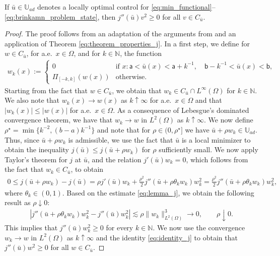 \documentclass[final]{siamart0216}
\begin{document}
\begin{theorem}\label{theorem_neccesary_conditions} If $\bar{u}\in \mathbb{U}_{ad}$ denotes a locally optimal control for \eqref{eq:min_functional}--\eqref{eq:brinkamn_problem_state}, then $j''(\bar{u})v^2\geq 0$ for all $v\in C_{\bar{u}}$.
\end{theorem}
\begin{proof}
The proof follows from an adaptation of the arguments from \cite[Theorem 23]{MR3586845} and an application of Theorem \ref{eq:theorem_properties_j}. In a first step, we define for $w\in C_{\bar{u}}$, for a.e.~$x\in\Omega$, and for $k\in\mathbb{N}$, the function 
\begin{eqnarray*}
w_k(x):=\left\{
\begin{array}{cl}
0 & \text{if } x: \mathsf{a}<\bar{u}(x)<\mathsf{a}+k^{-1},\quad \mathsf{b}-k^{-1}<\bar{u}(x)<\mathsf{b},\\
\Pi_{[-k,k]}(w(x)) & \text{otherwise}.
\end{array}
\right.
\end{eqnarray*}
Starting from the fact that $w\in C_{\bar{u}}$, we obtain that $w_k\in C_{\bar{u}}\cap L^{\infty}(\Omega)$ for $k \in \mathbb{N}$. We also note that $w_k(x)\to w(x)$ as $k\uparrow\infty$ for a.e.~$x\in\Omega$ and that $|w_k(x)|\leq |w(x)|$ for a.e.~$x\in\Omega$. As a consequence of Lebesgue's dominated convergence theorem, we have that $w_k\to w$ in $L^2(\Omega)$ as $k\uparrow\infty$. We now define $\rho^{\star}=\min\{k^{-2},(b-a)k^{-1}\}$ and note that for $\rho \in (0, \rho^{\star}]$ we have $\bar{u}+\rho w_k \in \mathbb{U}_{ad}$. Thus, since $\bar{u}+\rho w_k$ is admissible, we use the fact that $\bar{u}$ is a local minimizer to obtain the inequality $j(\bar{u})\leq j(\bar{u}+\rho w_k)$ for $\rho$ sufficiently small. We now apply Taylor's theorem for $j$ at $\bar{u}$, and the relation $j'(\bar{u})w_k=0$, which follows from the fact that $w_k\in C_{\bar{u}}$, to obtain 
\begin{align*}
0\leq j(\bar{u}+\rho w_k)-j(\bar{u})=\rho j'(\bar{u})w_k+\frac{\rho^2}{2}j''(\bar{u}+\rho \theta_k w_k)w_k^2 =\frac{\rho^2}{2}j''(\bar{u}+\rho\theta_k w_k)w_k^2,
\end{align*}
where $\theta_k\in(0,1)$. Based on the estimate \eqref{eq:lemma_j}, we obtain the following result as $\rho\downarrow 0$:
\begin{align*}
|j''(\bar{u}+\rho\theta_k w_k)w_k^2-j''(\bar{u})w_k^2|\lesssim\rho \|w_k\|_{L^2(\Omega)}^3\to 0,
\qquad \rho\downarrow 0.
\end{align*}
This implies that $j''(\bar{u})w_k^2\geq 0$ for every $k\in\mathbb{N}$. We now use the convergence $w_k\to w$ in $L^2(\Omega)$ as $k\uparrow\infty$ and the identity \eqref{eq:identity_j} to obtain that $j''(\bar{u})w^2 \geq 0$ for all $w \in C_{\bar{u}}$.
\end{proof}
\end{document}
